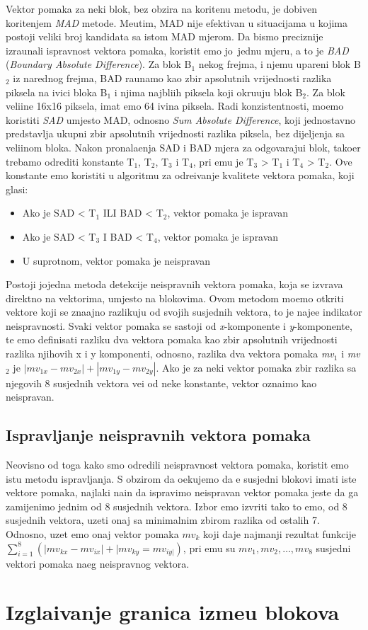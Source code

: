 Vektor pomaka za neki blok, bez obzira na kori\sh tenu metodu, je dobiven kori\sh tenjem \textit{MAD} metode. Me\dj utim, MAD nije efektivan u situacijama u kojima postoji veliki broj kandidata sa istom MAD mjerom.
Da bismo preciznije izra\ch unali ispravnost vektora pomaka, koristit \cj emo jo\sh\ jednu mjeru, a to je \textit{BAD} (\textit{Boundary Absolute Difference}). Za blok B$_1$ nekog frejma, i njemu upareni blok B$_2$ iz narednog
frejma, BAD ra\ch unamo kao zbir apsolutnih vrijednosti razlika piksela na ivici bloka B$_1$ i njima najbli\zh ih piksela koji okru\zh uju blok B$_2$. %
Za blok veli\ch ine 16x16 piksela, imat \cj emo 64 ivi\ch na piksela. Radi konzistentnosti, mo\zh emo koristiti \textit{SAD} umjesto MAD, odnosno \textit{Sum Absolute Difference}, koji jednostavno predstavlja ukupni zbir
apsolutnih vrijednosti razlika piksela, bez dijeljenja sa veli\ch inom bloka. Nakon pronala\zh enja SAD i BAD mjera za odgovaraju\cj i blok, tako\dj er trebamo odrediti konstante T$_1$, T$_2$, T$_3$ i T$_4$, pri \ch emu je T$_3$ > T$_1$ i T$_4$ > T$_2$. 
Ove konstante \cj emo koristiti u algoritmu za odre\dj ivanje kvalitete vektora pomaka, koji glasi:
\begin{itemize}
	\item Ako je SAD < T$_1$ ILI BAD < T$_2$, vektor pomaka je ispravan
	\item Ako je SAD < T$_3$ I BAD < T$_4$, vektor pomaka je ispravan
	\item U suprotnom, vektor pomaka je neispravan
\end{itemize}

Postoji jo\sh jedna metoda detekcije neispravnih vektora pomaka, koja se izvr\sh ava direktno na vektorima, umjesto na blokovima. Ovom metodom mo\zh emo otkriti vektore koji se zna\ch ajno razlikuju od svojih susjednih vektora,
\sh to je naj\ch e\sh \cj e indikator neispravnosti. Svaki vektor pomaka se sastoji od \textit{x}-komponente i \textit{y}-komponente, te \cj emo definisati razliku dva vektora pomaka kao zbir apsolutnih vrijednosti razlika njihovih
x i y komponenti, odnosno, razlika dva vektora pomaka \textit{mv$_1$} i \textit{mv$_2$} je $|mv_{1x} - mv_{2x}| + |mv_{1y} - mv_{2y}|$. Ako je za neki vektor pomaka zbir razlika sa njegovih 8 susjednih vektora ve\cj i od neke
konstante, vektor ozna\ch imo kao neispravan.

\subsection{Ispravljanje neispravnih vektora pomaka}
Neovisno od toga kako smo odredili neispravnost vektora pomaka, koristit \cj emo istu metodu ispravljanja. S obzirom da o\ch ekujemo da \cj e susjedni blokovi imati iste vektore pomaka, najlak\sh i na\ch in da ispravimo neispravan 
vektor pomaka jeste da ga zamijenimo jednim od 8 susjednih vektora. Izbor \cj emo izvr\sh iti tako \sh to \cj emo, od 8 susjednih vektora, uzeti onaj sa minimalnim zbirom razlika od ostalih 7. Odnosno, uzet \cj emo onaj vektor pomaka
$mv_k$ koji daje najmanji rezultat funkcije $\sum_{i=1}^{8}(|mv_{kx}-mv_{ix}|+|mv_{ky}=mv_{iy|})$, pri \ch emu su $mv_1, mv_2, \ldots , mv_8$ susjedni vektori pomaka na\sh eg neispravnog vektora.

\section{Izgla\dj ivanje granica izme\dj u blokova}